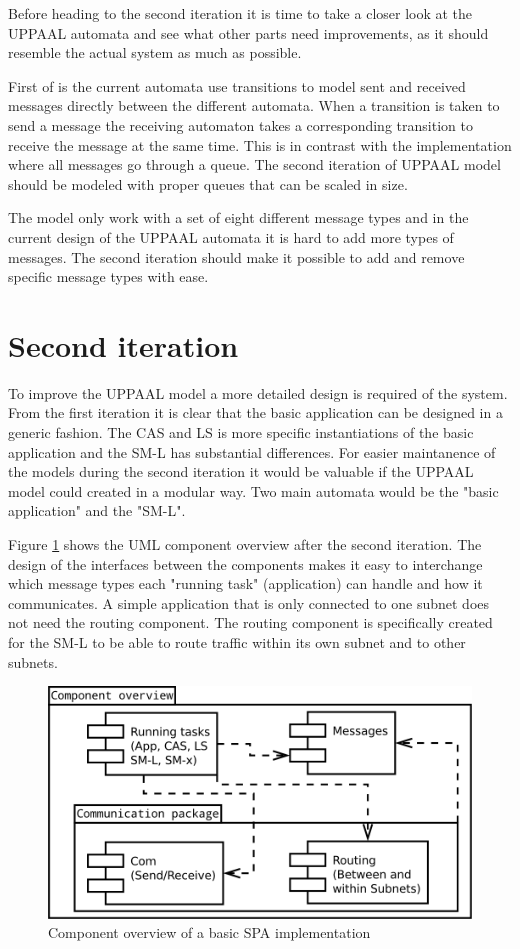Before heading to the second iteration it is time to take a closer look at the
UPPAAL automata and see what other parts need improvements, as it should
resemble the actual system as much as possible.

First of is the current automata use transitions to model sent and
received messages directly between the different automata. When a transition is
taken to send a message the receiving automaton takes a corresponding
transition to receive the message at the same time. This is in contrast with the
implementation where all messages go through a queue. The second iteration of
UPPAAL model should be modeled with proper queues that can be scaled in size.

The model only work with a set of eight different message types and in the
current design of the UPPAAL automata it is hard to add more types of messages.
The second iteration should make it possible to add and remove
specific message types with ease.

\section{Second iteration}
To improve the UPPAAL model a more detailed design is required of the system.
From the first iteration it is clear that the basic application can be designed
in a generic fashion. The CAS and LS is more specific instantiations of the
basic application and the SM-L has substantial differences. For easier
maintanence of the models during the second iteration it would be valuable if
the UPPAAL model could created in a modular way. Two main automata would be the
"basic application" and the "SM-L".

Figure \ref{fig:iteration2_uml_component_overview} shows the UML component
overview after the second iteration. The design of the interfaces between the
components makes it easy to interchange which message types each "running task"
(application) can handle and how it communicates. A simple application that is
only connected to one subnet does not need the routing component. The routing
component is specifically created for the SM-L to be able to route traffic
within its own subnet and to other subnets.

\begin{figure}[h]
    \centering
    \includegraphics[width=\textwidth]{figures/iteration2_uml_component_overview}
    \caption{Component overview of a basic SPA implementation}
    \label{fig:iteration2_uml_component_overview}
\end{figure}

